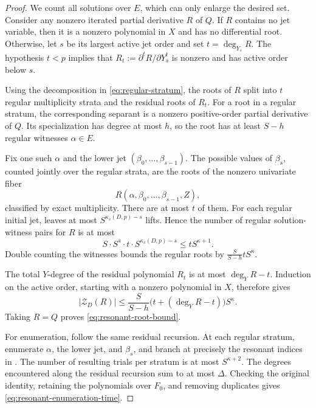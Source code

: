 \documentclass[11pt,letterpaper]{article}
\theoremstyle{definition}
\begin{document}
\begin{proof}
We count all solutions over \(E\), which can only enlarge the desired set.
Consider any nonzero iterated partial derivative \(R\) of \(Q\).  If
\(R\) contains no jet variable, then it is a nonzero polynomial in \(X\)
and has no differential root.  Otherwise, let \(s\) be its largest active
jet order and set \(t=\deg_{Y_s}R\).  The hypothesis \(t<p\) implies that
\(R_t:=\partial^tR/\partial Y_s^t\) is nonzero and has active order below
\(s\).

Using the decomposition in \eqref{eq:regular-stratum}, the roots of \(R\)
split into \(t\) regular multiplicity strata and the residual roots of
\(R_t\).  For a root in a regular stratum, the corresponding separant is a
nonzero positive-order partial derivative of \(Q\).  Its specialization has
degree at most \(h\), so the root has at least \(S-h\) regular witnesses
\(\alpha\in E\).

Fix one such \(\alpha\) and the lower jet
\((\beta_0,\ldots,\beta_{s-1})\).  The possible values of \(\beta_s\),
counted jointly over the regular strata, are the roots of the nonzero
univariate fiber
\[
  R(\alpha,\beta_0,\ldots,\beta_{s-1},Z),
\]
classified by exact multiplicity.  There are at most \(t\) of them.
For each regular initial jet,  leaves at most
\(S^{\kappa_s(D,p)-s}\) lifts.  Hence the number of regular
solution-witness pairs for \(R\) is at most
\[
  S\cdot S^s\cdot t\cdot
  S^{\kappa_s(D,p)-s}
  \leq tS^{\kappa+1}.
\]
Double counting the witnesses bounds the regular roots by
\(\frac{S}{S-h}tS^\kappa\).

The total \(Y\)-degree of the residual polynomial \(R_t\) is at most
\(\deg_YR-t\).  Induction on the active order, starting with a nonzero
polynomial in \(X\), therefore gives
\[
  |\mathcal Z_D(R)|
  \leq
  \frac{S}{S-h}
  \bigl(t+(\deg_YR-t)\bigr)S^\kappa.
\]
Taking \(R=Q\) proves \eqref{eq:resonant-root-bound}.

For enumeration, follow the same residual recursion.  At each regular
stratum, enumerate \(\alpha\), the lower jet, and \(\beta_s\), and branch
at precisely the resonant indices in .  The
number of resulting trials per stratum is at most \(S^{\kappa+2}\).  The
degrees encountered along the residual recursion sum to at most \(\Delta\).
Checking the original identity, retaining the polynomials over \(F_0\),
and removing duplicates gives \eqref{eq:resonant-enumeration-time}.
\end{proof}
\end{document}
